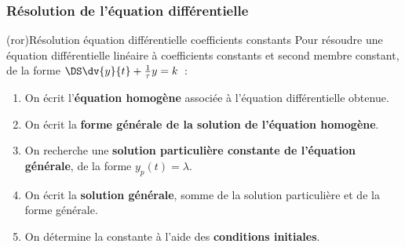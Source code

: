 \documentclass[../../main/main.tex]{subfiles}
\begin{document}
\subsubsection{Résolution de l'équation différentielle}
\begin{tcb*}[label=impo:eqres,
  list entry={\lte\theror~:~Résolution equa.\ diff.\ ordre 1}]
  (ror){Résolution équation différentielle coefficients constants}
	Pour résoudre une équation différentielle linéaire à
	coefficients constants et second membre constant, de la forme
	$\DS \dv{y}{t} + \frac{1}{\tau}y = k$~:
	\begin{enumerate}[label=\sqenumi]
		\item On écrit l'\textbf{équation homogène} associée à
		      l'équation différentielle obtenue.
		\item On écrit la \textbf{forme générale de la solution de
			      l'équation homogène}.
		\item On recherche une \textbf{solution particulière
			      constante de l'équation générale}, de la forme $y_p(t) =
			      \lambda$.
		\item On écrit la \textbf{solution générale}, somme de la
		      solution particulière et de la forme générale.
		\item On détermine la constante à l'aide des
		      \textbf{conditions initiales}.
	\end{enumerate}
\end{tcb*}
\end{document}
